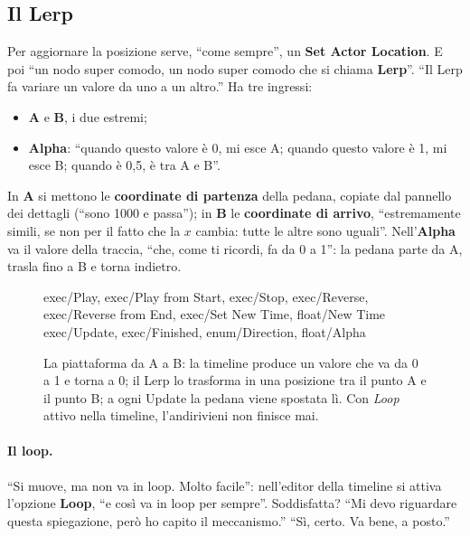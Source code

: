 \subsection{Il Lerp}

Per aggiornare la posizione serve, ``come sempre'', un \textbf{Set Actor
Location}. E poi ``un nodo super comodo, un nodo super comodo che si chiama
\textbf{Lerp}''. ``Il Lerp fa variare un valore da uno a un altro.'' Ha tre
ingressi:
\begin{itemize}
  \item \textbf{A} e \textbf{B}, i due estremi;
  \item \textbf{Alpha}: ``quando questo valore è 0, mi esce A; quando questo
        valore è 1, mi esce B; quando è 0,5, è tra A e B''.
\end{itemize}
In \textbf{A} si mettono le \textbf{coordinate di partenza} della pedana, copiate
dal pannello dei dettagli (``sono 1000 e passa''); in \textbf{B} le
\textbf{coordinate di arrivo}, ``estremamente simili, se non per il fatto che la
$x$ cambia: tutte le altre sono uguali''. Nell'\textbf{Alpha} va il valore della
traccia, ``che, come ti ricordi, fa da 0 a 1'': la pedana parte da A, trasla fino
a B e torna indietro.

\begin{figure}[htbp]
\centering
\begin{bpgraph}
    {exec/Play, exec/Play from Start, exec/Stop, exec/Reverse, exec/Reverse from End, exec/Set New Time, float/New Time}%
    {exec/Update, exec/Finished, enum/Direction, float/Alpha}
\end{bpgraph}
\caption{La piattaforma da A a B: la timeline produce un valore che va da 0 a 1
e torna a 0; il Lerp lo trasforma in una posizione tra il punto A e il punto B;
a ogni Update la pedana viene spostata lì. Con \emph{Loop} attivo nella
timeline, l'andirivieni non finisce mai.}
\label{gd13:fig:lerp}
\end{figure}

\paragraph{Il loop.} ``Si muove, ma non va in loop. Molto facile'': nell'editor
della timeline si attiva l'opzione \textbf{Loop}, ``e così va in loop per
sempre''. Soddisfatta? ``Mi devo riguardare questa spiegazione, però ho capito il
meccanismo.'' ``Sì, certo. Va bene, a posto.''

